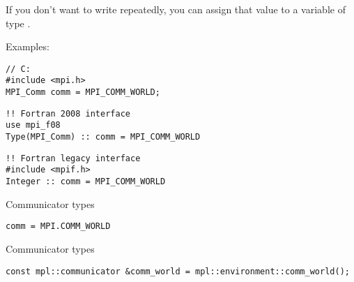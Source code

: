 If you don't want to write  repeatedly, you can
assign that value to a variable of type .

Examples:
\lstset{language=C}
\begin{lstlisting}
// C:
#include <mpi.h>
MPI_Comm comm = MPI_COMM_WORLD;
\end{lstlisting}

\lstset{language=Fortran}
\begin{lstlisting}
!! Fortran 2008 interface
use mpi_f08
Type(MPI_Comm) :: comm = MPI_COMM_WORLD
\end{lstlisting}

\begin{lstlisting}
!! Fortran legacy interface
#include <mpif.h>
Integer :: comm = MPI_COMM_WORLD
\end{lstlisting}
\lstset{language=C}

\begin{pythonnote}{Communicator types}
\lstset{language=python}
\begin{lstlisting}
comm = MPI.COMM_WORLD
\end{lstlisting}
\end{pythonnote}

\begin{mplnote}{Communicator types}
\lstset{language=C++}
\begin{lstlisting}
const mpl::communicator &comm_world = mpl::environment::comm_world();  
\end{lstlisting}
\end{mplnote}
